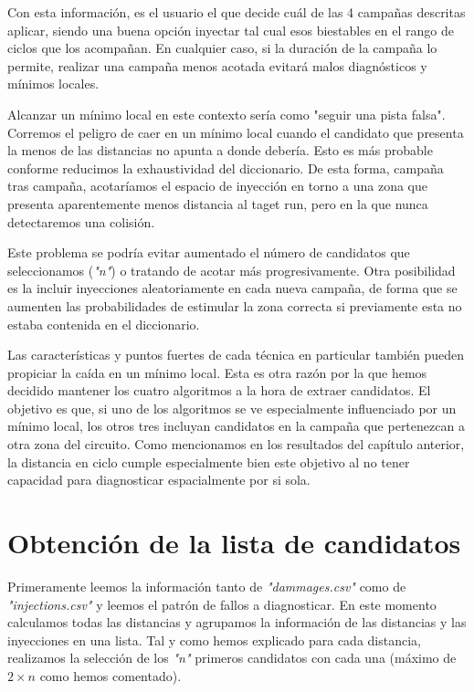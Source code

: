 Con esta información, es el usuario el que decide cuál de las 4 campañas descritas
aplicar, siendo una buena opción inyectar tal cual esos biestables en el rango de
ciclos que los acompañan. En cualquier caso, si la duración de la campaña lo
permite, realizar una campaña menos acotada evitará malos diagnósticos y mínimos
locales.

Alcanzar un mínimo local en este contexto sería como "seguir una pista falsa".
Corremos el peligro de caer en un mínimo local cuando el candidato que presenta la
menos de las distancias no apunta a donde debería. Esto es más probable conforme
reducimos la exhaustividad del diccionario. De esta forma, campaña tras campaña,
acotaríamos el espacio de inyección en torno a una zona que presenta aparentemente
menos distancia al taget run, pero en la que nunca detectaremos una colisión. 

Este problema se podría evitar aumentado el número de candidatos que seleccionamos
(\textit{"n"}) o tratando de acotar más progresivamente. Otra posibilidad es la
incluir inyecciones aleatoriamente en cada nueva campaña, de forma que se aumenten
las probabilidades de estimular la zona correcta si previamente esta no estaba
contenida en el diccionario.

Las características y puntos fuertes de cada técnica en particular también pueden
propiciar la caída en un mínimo local. Esta es otra razón por la que hemos
decidido mantener los cuatro algoritmos a la hora de extraer candidatos. El
objetivo es que, si uno de los algoritmos se ve especialmente influenciado por un
mínimo local, los otros tres incluyan candidatos en la campaña que pertenezcan a
otra zona del circuito. Como mencionamos en los resultados del capítulo anterior,
la distancia en ciclo cumple especialmente bien este objetivo al no tener
capacidad para diagnosticar espacialmente por si sola.

\section{Obtención de la lista de candidatos}
\label{sec:Candidatos}
Primeramente leemos la información tanto de \textit{"dammages.csv"} como de 
\textit{"injections.csv"} y leemos el patrón de fallos a diagnosticar. En este
momento calculamos todas las distancias y agrupamos la información de las
distancias y las inyecciones en una lista. Tal y como hemos explicado para cada
distancia, realizamos la selección de los \textit{"n"} primeros candidatos con
cada una (máximo de $2 \times n$ como hemos comentado).

